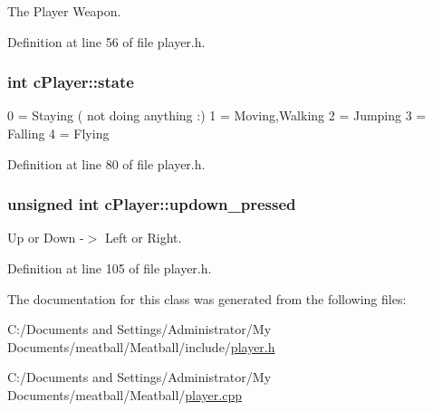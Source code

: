 The Player Weapon. 



Definition at line 56 of file player.\-h.

\hypertarget{classc_player_a770b16e87c30e5ae205af92038fac0f9}{
\subsubsection[{state}]{\setlength{\rightskip}{0pt plus 5cm}int c\-Player\-::state}}\label{classc_player_a770b16e87c30e5ae205af92038fac0f9}
0 = Staying ( not doing anything \-:) 1 = Moving,Walking 2 = Jumping 3 = Falling 4 = Flying 

Definition at line 80 of file player.\-h.

\hypertarget{classc_player_ac2cb468d98391a6b9fbaa6db2e103a2d}{
\subsubsection[{updown\-\_\-pressed}]{\setlength{\rightskip}{0pt plus 5cm}unsigned int c\-Player\-::updown\-\_\-pressed}}\label{classc_player_ac2cb468d98391a6b9fbaa6db2e103a2d}


Up or Down -\/$>$ Left or Right. 



Definition at line 105 of file player.\-h.



The documentation for this class was generated from the following files\-:\begin{DoxyCompactItemize}
\item 
C\-:/\-Documents and Settings/\-Administrator/\-My Documents/meatball/\-Meatball/include/\hyperlink{player_8h}{player.\-h}\item 
C\-:/\-Documents and Settings/\-Administrator/\-My Documents/meatball/\-Meatball/\hyperlink{player_8cpp}{player.\-cpp}\end{DoxyCompactItemize}
